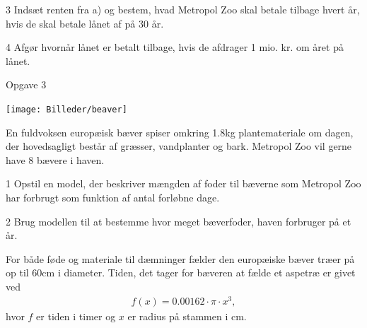 \documentclass[12pt,x11names,a4paper]{article}
\begin{document}
\begin{delopgave}{}{3}
	Indsæt renten fra a) og bestem, hvad Metropol Zoo skal betale tilbage hvert år, hvis de 
	skal betale lånet af på 30 år.
\end{delopgave}
\begin{delopgave}{}{4}
	Afgør hvornår lånet er betalt tilbage, hvis de afdrager 1 mio. kr. om året på lånet. 
\end{delopgave}

\newpage
\begin{opgavetekst}{Opgave 3}
	\begin{center}
		\texttt{[image: Billeder/beaver]}
	\end{center}
	En fuldvoksen europæisk bæver spiser omkring 1.8kg plantemateriale om dagen, der 
	hovedsagligt består af græsser, vandplanter og bark. Metropol Zoo vil gerne have 8 bævere 
	i haven.
\end{opgavetekst}
\begin{delopgave}{}{1}
	Opstil en model, der beskriver mængden af foder til bæverne som Metropol Zoo har forbrugt
	som funktion af antal forløbne dage. 
\end{delopgave}
\begin{delopgave}{}{2}
	Brug modellen til at bestemme hvor meget bæverfoder, haven forbruger på et år.
\end{delopgave}
\begin{meretekst}
	For både føde og materiale til dæmninger fælder den europæiske bæver træer på op til 60cm i
	diameter. Tiden, det tager for bæveren at fælde et aspetræ er givet ved
	\begin{align*}
		f(x) = 0.00162\cdot \pi \cdot x^3,
	\end{align*}
	hvor $f$ er tiden i timer og $x$ er radius på stammen i cm. 
\end{meretekst}
\end{document}
